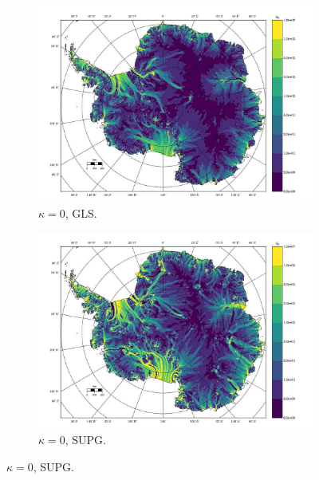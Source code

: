 \begin{figure}
  \label{antarctica_bv_image_d_U_ob}
  
\end{figure}


\begin{figure}

  \centering

  \begin{subfigure}[b]{0.45\linewidth}
    \includegraphics[width=\linewidth]{images/balance_velocity/antarctica/d_gS_m_U/Ubar_10H_kappa_0_GLS.jpg}
  \caption{$\kappa = 0$, GLS.}
  \label{antarctica_bv_image_d_gS_m_U_kappa_0_GLS}
  \end{subfigure}
  \begin{subfigure}[b]{0.45\linewidth}
    \includegraphics[width=\linewidth]{images/balance_velocity/antarctica/d_gS_m_U/Ubar_10H_kappa_0_SUPG.jpg}
  \caption{$\kappa = 0$, SUPG.}
  \label{antarctica_bv_image_d_gS_m_U_kappa_0_SUPG}
  \end{subfigure}


\end{figure}

